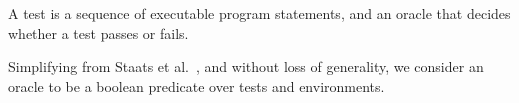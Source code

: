 \begin{definition}[Test]
%

A test is a sequence of executable program statements, and an oracle that
decides whether a test passes or fails.
\end{definition}



Simplifying from Staats
et al.~\cite{staatsetal:ICSE:2011}, and without loss of generality,
we consider an oracle to be a boolean predicate over tests and environments.


